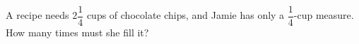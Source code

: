 A recipe needs $2\dfrac14$ cups of chocolate chips, and Jamie has only a $\dfrac14$-cup measure. How many times must she fill it?
